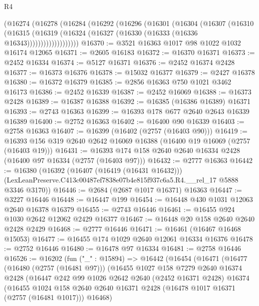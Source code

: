 \begin{lexlean}{R4}
\begin{coremodule}
          (@16274
            (@16278
              (@16284
                (@16292
                  (@16296
                    (@16301
                      (@16304
                        (@16307
                          (@16310
                            (@16315
                              (@16319
                                (@16324 (@16327 (@16330 (@16333 (@16336 @16343)))))))))))))))))))
@16370 := @3521 @16363 @1017 @98 @1022 @1032 @16174 @12065
@16371 := @2605 @16183
@16372 := @16370 @16371
@16373 := @2452 @16334
@16374 := @5127 @16371
@16376 := @2452 @16374 @2428
@16377 := @16373 @16376
@16378 := @15032 @16377
@16379 := @2427 @16378
@16380 := @16372 @16379
@16385 := @2856 @16363 @750 @1021 @3462 @16173
@16386 := @2452 @16339
@16387 := @2452 @16069
@16388 := @16373 @2428
@16389 := @16387 @16388
@16392 := @16385 (@16386 @16389) @16371
@16393 := @2743 @16363
@16399 := @16393 @178 @677 @2640 @2643 @16339 @16389
@16400 := @2752 @16363
@16402 := @16400 @90 @16339
@16403 := @2758 @16363
@16407 := @16399 (@16402 (@2757 (@16403 @90)))
@16419 := @16393 @156 @319 @2640 @2642 @16069 @16388 (@16400 @19 @16069 (@2757 (@16403 @19)))
@16431 := @16393 @174 @158 @2640 @2640 @16334 @2428 (@16400 @97 @16334 (@2757 (@16403 @97)))
@16432 := @2777 @16363
@16442 := @16380
    (@16392
      (@16407 (@16419 (@16431 @16432)))
      (LexLeanPreserve.C413c00487ef7838e07b4e815f937c6a5.R4.__rel_17 @5888 @3346 @3170))
@16446 := @2684 (@2687 @1017 @16371) @16363
@16447 := @3227 @16446
@16448 := @16447 @199
@16454 := @16448 @430 @1031 @12063 @2640 @16378 @16379
@16455 := @2743 @16446
@16461 := @16455 @924 @1030 @2642 @12062 @2429 @16377
@16467 := @16448 @20 @158 @2640 @2640 @2428 @2429
@16468 := @2777 @16446
@16471 := @16461 (@16467 @16468 @15053)
@16477 := @16455 @174 @1029 @2640 @12061 @16334 @16376
@16478 := @2752 @16446
@16480 := @16478 @97 @16334
@16481 := @2758 @16446
@16526 := @16202
    (fun ("_" : @15894) =>
    @16442
      (@16454
        (@16471
          (@16477
            (@16480 (@2757 (@16481 @97)))
            (@16455
              @1027
              @158
              @7279
              @2640
              @16374
              @2428
              (@16447
                @242
                @99
                @1026
                @2642
                @2640
                (@2452 @16371 @2428)
                @16374
                (@16455
                  @1024
                  @158
                  @2640
                  @2640
                  @16371
                  @2428
                  (@16478 @1017 @16371 (@2757 (@16481 @1017)))
                  @16468)

\end{coremodule}
\end{lexlean}
